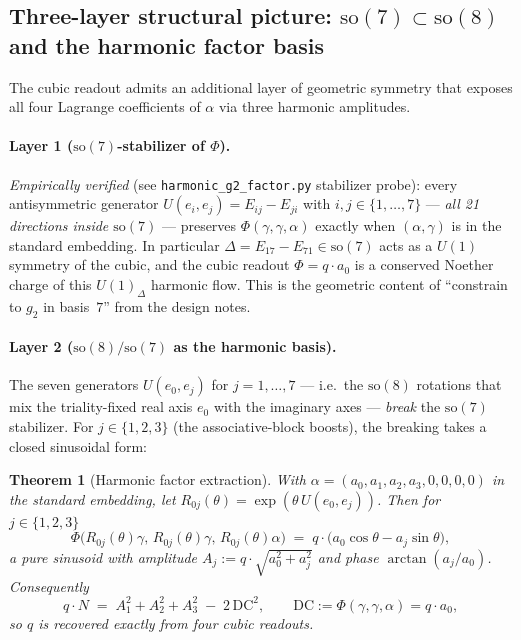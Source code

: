 \documentclass[11pt,a4paper]{article}
\theoremstyle{plain}
\newtheorem{theorem}{Theorem}[section]
\theoremstyle{definition}
\theoremstyle{remark}
\begin{document}
\subsection{Three-layer structural picture: $\mathrm{so}(7) \subset \mathrm{so}(8)$ and the
harmonic factor basis}
\label{sec:harmonic-factor-basis}

The cubic readout admits an additional layer of geometric symmetry that exposes
all four Lagrange coefficients of $\alpha$ via three harmonic amplitudes.

\paragraph{Layer 1 ($\mathrm{so}(7)$-stabilizer of $\Phi$).}
\emph{Empirically verified} (see \texttt{harmonic\_g2\_factor.py} stabilizer
probe): every antisymmetric generator $U(e_i, e_j) = E_{ij} - E_{ji}$ with
$i, j \in \{1, \ldots, 7\}$ — \emph{all 21 directions inside $\mathrm{so}(7)$} —
preserves $\Phi(\gamma, \gamma, \alpha)$ exactly when $(\alpha, \gamma)$ is in
the standard embedding. In particular $\Delta = E_{17} - E_{71} \in \mathrm{so}(7)$
acts as a $U(1)$ symmetry of the cubic, and the cubic readout
$\Phi = q \cdot a_0$ is a conserved Noether charge of this $U(1)_\Delta$
harmonic flow. This is the geometric content of ``constrain to $g_2$ in
basis~$7$'' from the design notes.

\paragraph{Layer 2 ($\mathrm{so}(8)/\mathrm{so}(7)$ as the harmonic basis).}
The seven generators $U(e_0, e_j)$ for $j = 1, \ldots, 7$ — i.e.\ the
$\mathrm{so}(8)$ rotations that mix the triality-fixed real axis $e_0$ with the
imaginary axes — \emph{break} the $\mathrm{so}(7)$ stabilizer. For
$j \in \{1, 2, 3\}$ (the associative-block boosts), the breaking takes a
closed sinusoidal form:

\begin{theorem}[Harmonic factor extraction]\label{thm:harmonic-extract}
With $\alpha = (a_0, a_1, a_2, a_3, 0, 0, 0, 0)$ in the standard embedding, let
$R_{0j}(\theta) = \exp(\theta\, U(e_0, e_j))$. Then for $j \in \{1, 2, 3\}$
\begin{equation}\label{eq:sinusoid}
\Phi\bigl(R_{0j}(\theta)\gamma,\, R_{0j}(\theta)\gamma,\, R_{0j}(\theta)\alpha\bigr)
 \;=\; q \cdot \bigl(a_0 \cos\theta - a_j \sin\theta\bigr),
\end{equation}
a pure sinusoid with amplitude $A_j := q \cdot \sqrt{a_0^2 + a_j^2}$ and
phase $\arctan(a_j / a_0)$. Consequently
\begin{equation}\label{eq:harmonic-extract}
q \cdot N \;=\; A_1^2 + A_2^2 + A_3^2 \;-\; 2\,\mathrm{DC}^2,
\qquad \mathrm{DC} := \Phi(\gamma, \gamma, \alpha) = q \cdot a_0,
\end{equation}
so $q$ is recovered exactly from four cubic readouts.
\end{theorem}
\end{document}

